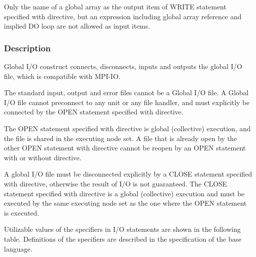    Only the name of a global array
   as the output item
   of WRITE statement specified with \gio directive, 
   but an expression including global array
   reference and implied DO loop are not allowed as input items.

   \subsubsection*{Description}

   Global I/O construct connects, disconnects, inputs and outputs the global I/O file,
   which is compatible with MPI-IO.

   The standard input, output and error files cannot be a Global I/O file.
   A Global I/O file cannot preconnect to any unit or any file handler,
   and must explicitly be connected by the OPEN statement specified with
   \gio directive.

   The OPEN statement specified with \gio directive is global
   (collective) execution, and the file is shared in the executing node
   set.
   A file that is already open by the other OPEN statement with
   \gio directive cannot be reopen by an OPEN statement with or
   without \gio directive.

   A global I/O file must be disconnected explicitly by a CLOSE
   statement specified with \gio directive, otherwise the result of I/O
   is not guaranteed.
   The CLOSE statement specified with \gio directive is a global
   (collective) execution and must be executed by the same executing
   node set as the one where the OPEN statement is executed.

   Utilizable values of the specifiers in I/O statements are shown in the
   following table.
   Definitions of the specifiers are described in the specification of
   the base language.

